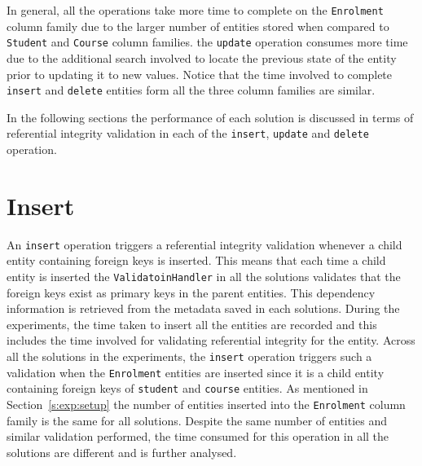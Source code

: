 	
	
% 	

	In general, all the operations take more time to complete on the
	\texttt{Enrolment} column family due to the larger number of entities stored
	when compared to \texttt{Student} and \texttt{Course} column families. the
	\texttt{update} operation consumes more time due to the additional search
	involved to locate the previous state of the entity prior to updating it to new
	values. Notice that the time involved to complete \texttt{insert} and
	\texttt{delete} entities form all the three column families are similar.
	
	In the following sections the performance of each solution is discussed in
	terms of referential integrity validation in each of the \texttt{insert},
	\texttt{update} and \texttt{delete} operation.
	
\section{Insert}\label{sr:insert}
An \texttt{insert} operation triggers a referential integrity validation
whenever a child entity containing foreign keys is inserted. This means that
each time a child entity is inserted the \texttt{ValidatoinHandler} in all the
solutions validates that the foreign keys exist as primary keys in the parent
entities. This dependency information is retrieved from the metadata saved in
each solutions. During the experiments, the time taken to insert all the
entities are recorded and this includes the time involved for validating
referential integrity for the entity. Across all the solutions in the
experiments, the \texttt{insert} operation triggers such a validation when the
\texttt{Enrolment} entities are inserted since it is a child entity containing
foreign keys of \texttt{student} and \texttt{course} entities. As mentioned in
Section~\ref{s:exp:setup} the number of entities inserted into the
\texttt{Enrolment} column family is the same for all solutions. Despite the same
number of entities and similar validation performed, the time consumed for this
operation in all the solutions are different and is further analysed.
		
